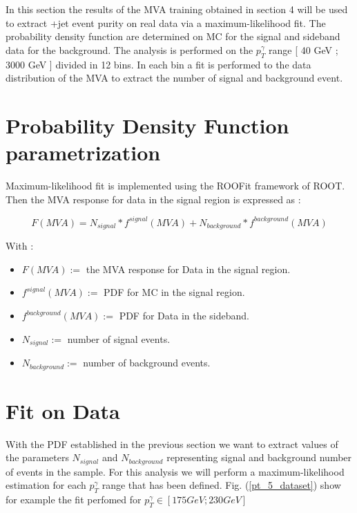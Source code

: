 \label{sec:unchapitre}

In this section the results of the MVA training obtained in section 4 will be used to extract \textgamma+jet event
purity on real data via a maximum-likelihood fit.
The probability density function are determined on MC for the signal and sideband data for the background.
The analysis is performed on the $p_T^\gamma$ range [ 40 GeV ; 3000 GeV ] divided in 12 bins.
In each bin a fit is performed to the data distribution of the MVA to extract the number of signal and background event.

\section{Probability Density Function parametrization}

Maximum-likelihood fit is implemented using the ROOFit framework of ROOT.
Then the MVA response for data in the signal region is expressed as : 

\begin{equation}
F(MVA) = N_{signal}*f^{signal}(MVA) + N_{background}*f^{background}(MVA)
\end{equation}

With : 
\begin{itemize}
	\item $F(MVA) :=$ the MVA response for Data in the signal region.
	\item $f^{signal}(MVA) :=$ PDF for MC in the signal region.
	\item $f^{background}(MVA) :=$ PDF for Data in the sideband. 
	\item $N_{signal} :=$ number of signal events.
	\item $N_{background} :=$ number of background events. 
\end{itemize}


\section{Fit on Data}

With the PDF established in the previous section we want to extract values of the parameters $N_{signal}$ and $N_{background}$ representing
signal and background number of events in the sample. For this analysis we will perform a maximum-likelihood estimation for
each $p_T^\gamma$ range that has been defined. Fig. (\ref{pt_5_dataset}) show for example the fit perfomed for
$p_T^\gamma \in [ 175 GeV ; 230 GeV ]$

